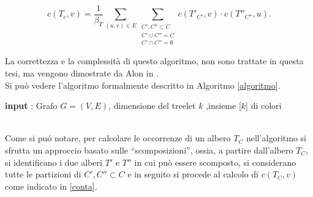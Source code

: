 \begin{equation}\label{conta}
	c(T_c,v)=\frac{1}{\beta_T}\sum_{(u,v)\in E}\sum_{\substack{C', C'' \subset C \\C' \cup C'' = C  \\ C' \cap C'' = \emptyset}}c(T'_{C'},v)\cdot c(T''_{C''},u).
\end{equation}

 La correttezza e la complessit\`a di questo algoritmo, non sono trattate in questa tesi, ma vengono dimostrate da Alon in \cite{alon1995color}.\\
 Si pu\`o vedere l'algoritmo formalmente  descritto in Algoritmo \ref{algoritmo}.\\


\begin{algorithm}[H]
	\label{algoritmo}
	\SetAlgoLined
 	\textbf{input} : Grafo $ G =(V,E) $, dimensione del treelet $ k $ ,insieme [$ k $] di colori\;	
 			
\end{algorithm}\mbox{}\\

Come si pu\'o notare, per calcolare le occorrenze di un albero $ T_C $ nell'algoritmo si sfrutta un approccio basato sulle ``scomposizioni'', ossia, a partire dall'albero $ T_C $, si identificano i due alberi $ T' $ e $ T'' $ in cui pu\`o essere scomposto, si considerano tutte le partizioni di $ C',C'' \subset C $ e in seguito si procede al calcolo di $ c(T_C,v) $ come indicato in \eqref{conta}.

